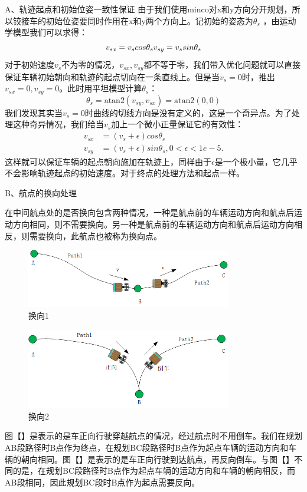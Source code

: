 \documentclass[master,academic]{ysuthesis} %
\begin{document}
		A、轨迹起点和初始位姿一致性保证
		由于我们使用minco对x和y方向分开规划，所以铰接车的初始位姿要同时作用在x和y两个方向上。记初始的姿态为$\theta_s$ ，由运动学模型我们可以求得：
		\begin{equation}
			v_{sx}=v_scos\theta _s\\
			v_{sy}=v_ssin\theta _s
		\end{equation}
		对于初始速度$v_s$不为零的情况，$v_{sx},v_{sy}$都不等于零，我们带入优化问题就可以直接保证车辆初始朝向和轨迹的起点切向在一条直线上。但是当$v_{s}=0$时，推出$v_{sx}=0,v_{sy}=0$。此时用平坦模型计算$\theta_s$：
		\begin{equation}
			\theta_s=\text{atan}2\left( v_{sy},v_{sx} \right) =\text{atan}2\left( 0,0 \right) 
		\end{equation}
		我们发现其实当$v_{s}=0$时曲线的切线方向是没有定义的，这是一个奇异点。为了处理这种奇异情况，我们给当$v_{s}$加上一个微小正量保证它的有效性：
		\begin{equation}
			\begin{aligned}
			v_{sx}&=\left( v_s+\epsilon \right) cos\theta_s\\
			v_{sy}&=\left( v_s+\epsilon \right) sin\theta_s,0<\epsilon <1e-5.
			\end{aligned}
		\end{equation}
		这样就可以保证车辆的起点朝向施加在轨迹上，同样由于$\epsilon$是一个极小量，它几乎不会影响轨迹起点的初始速度。对于终点的处理方法和起点一样。
		
		B、航点的换向处理
		
		在中间航点处的是否换向包含两种情况，一种是航点前的车辆运动方向和航点后运动方向相同，则不需要换向。另一种是航点前的车辆运动方向和航点后运动方向相反，则需要换向，此航点也被称为换向点。
		\begin{figure}[!ht]
			\centering
			\includegraphics[width=0.8\textwidth]{换向1.png}
			\caption{换向1}
			\label{fig:换向1}
		\end{figure}
		\begin{figure}[!ht]
			\centering
			\includegraphics[width=0.8\textwidth]{换向2.png}
			\caption{换向2}
			\label{fig:换向2}
		\end{figure}
		图【】是表示的是车正向行驶穿越航点的情况，经过航点时不用倒车。我们在规划AB段路径时B点作为终点，在规划BC段路径时B点作为起点车辆的运动方向和车辆的朝向相同。图【】是表示的是车正向行驶到达航点，再反向倒车。与图【】不同的是，在规划BC段路径时B点作为起点车辆的运动方向和车辆的朝向相反，而AB段相同，因此规划BC段时B点作为起点需要反向。
\end{document}
